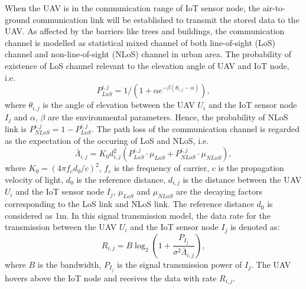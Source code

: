 \documentclass[conference]{IEEEtran}
\begin{document}
When the UAV is in the communication range of IoT sensor node, the air-to-ground communication link will be established to transmit the stored data to the UAV. As affected by the barriers like trees and buildings, the communication channel is modelled as statistical mixed channel of both line-of-sight (LoS) channel and non-line-of-sight (NLoS) channel in urban area\cite{MLi22}. The probability of existence of LoS channel relevant to the elevation angle of UAV and IoT node, i.e.
\begin{equation}\label{p_los}
  P_{LoS}^{i,j}=1/\left(1+\alpha e^{-\beta\left({\theta_{i,j}-\alpha}\right)}\right),
\end{equation}
where $\theta_{i,j}$ is the angle of elevation between the UAV $U_i$ and the IoT sensor node $I_j$ and $\alpha$, $\beta$ are the environmental parameters. Hence, the probability of NLoS link is $P_{NLoS}^{i,j}=1-P_{LoS}^{i,j}$. 
The path loss of the communication channel is regarded as the expectation of the occuring of LoS and NLoS, i.e.
\begin{equation}\label{avg_path_loss}
  \bar{\Lambda}_{i,j}=K_0 d_{i,j}^2 \left(P_{LoS}^{i,j}\cdot\mu_{LoS}+P_{NLoS}^{i,j}\cdot\mu_{NLoS}\right),
\end{equation}
where $K_0=\left({4\pi f_c d_0 /c}\right)^2$, $f_c$ is the frequency of carrier, $c$ is the propagation velocity of light, $d_0$ is the reference distance, $d_{i,j}$ is the distance between the UAV $U_i$ and the IoT sensor node $I_j$, $\mu_{LoS}$ and $\mu_{NLoS}$ are the decaying factors corresponding to the LoS link and NLoS link. The reference distance $d_0$ is considered as 1m. In this signal transmission model, the data rate for the transmission between the UAV $U_i$ and the IoT sensor node $I_j$ is denoted as: 
\begin{equation}\label{data_rate}
  R_{i,j}=B\log_{2}\left(1+\frac{P_{I_j}}{\sigma^2 \bar{\Lambda}_{i,j}}\right),
\end{equation}
where $B$ is the bandwidth, $P_{I_j}$ is the signal transmission power of $I_j$. The UAV hovers above the IoT node and receives the data with rate $R_{i,j}$.
\end{document}
